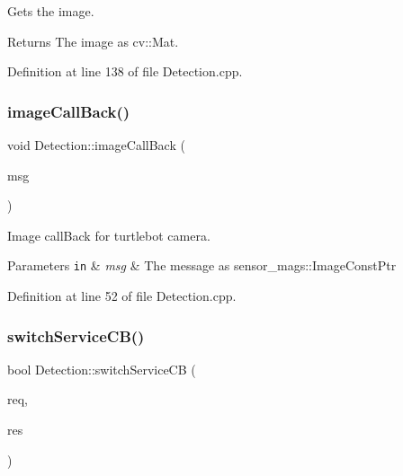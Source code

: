 Gets the image. 

\begin{DoxyReturn}{Returns}
The image as cv\+::\+Mat. 
\end{DoxyReturn}


Definition at line 138 of file Detection.\+cpp.

\mbox{\label{class_detection_a1d21be46013c15983191c1bb0835e205}} 
\subsubsection{\texorpdfstring{image\+Call\+Back()}{imageCallBack()}}
{\footnotesize\ttfamily void Detection\+::image\+Call\+Back (\begin{DoxyParamCaption}\item[{const sensor\+\_\+msgs\+::\+Image\+Const\+Ptr \&}]{msg }\end{DoxyParamCaption})}



Image call\+Back for turtlebot camera. 


\begin{DoxyParams}[1]{Parameters}
\mbox{\tt in}  & {\em msg} & The message as sensor\+\_\+mags\+::\+Image\+Const\+Ptr \\
\hline
\end{DoxyParams}


Definition at line 52 of file Detection.\+cpp.

\mbox{\label{class_detection_a8a843a92cb338bd139126f23f230938d}} 
\subsubsection{\texorpdfstring{switch\+Service\+C\+B()}{switchServiceCB()}}
{\footnotesize\ttfamily bool Detection\+::switch\+Service\+CB (\begin{DoxyParamCaption}\item[{enigma\+::start\+Stop\+::\+Request \&}]{req,  }\item[{enigma\+::start\+Stop\+::\+Response \&}]{res }\end{DoxyParamCaption})}




